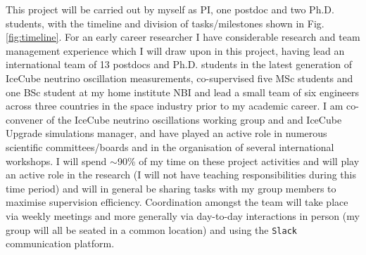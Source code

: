 \documentclass[a4paper,11pt]{article}
\begin{document}
This project will be carried out by myself as PI, one postdoc and two Ph.D. students, with the timeline and division of tasks/milestones shown in Fig. \ref{fig:timeline}. For an early career researcher I have considerable research and team management experience which I will draw upon in this project, having lead an international team of 13 postdocs and Ph.D. students in the latest generation of IceCube neutrino oscillation measurements, co-supervised five MSc students and one BSc student at my home institute NBI and lead a small team of six engineers across three countries in the space industry prior to my academic career. I am co-convener of the IceCube neutrino oscillations working group and and IceCube Upgrade simulations manager, and have played an active role in numerous scientific committees/boards and in the organisation of several international workshops. I will spend $\sim$90\% of my time on these project activities and will play an active role in the research (I will not have teaching responsibilities during this time period) and will in general be sharing tasks with my group members to maximise supervision efficiency. Coordination amongst the team will take place via weekly meetings and more generally via day-to-day interactions in person (my group will all be seated in a common location) and using the \texttt{Slack} communication platform. 
\end{document}
